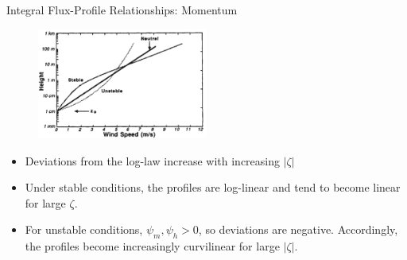 \begin{frame}{Integral Flux-Profile Relationships: Momentum}
\begin{figure}
	\includegraphics[width=0.5\textwidth]{loglaw1}
\end{figure}
\begin{itemize}
	\item Deviations from the log-law increase with increasing $|\zeta|$
	\item Under stable conditions, the profiles are log-linear and tend to become linear for large $\zeta$.
	\item For unstable conditions, $\psi_m, \psi_h > 0$, so deviations are negative. Accordingly, the profiles become increasingly curvilinear for large $|\zeta|$. 
\end{itemize}
\end{frame}
